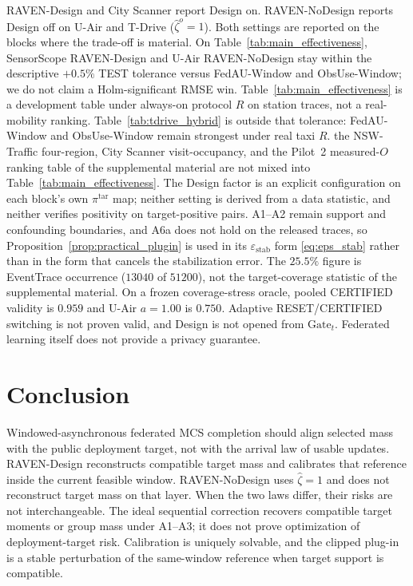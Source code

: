 \documentclass[letterpaper,journal]{IEEEtran}
\begin{document}
RAVEN-Design and City Scanner
report Design on.  RAVEN-NoDesign reports Design off on U-Air and T-Drive
($\widehat\zeta^{o}=1$).  Both settings are reported on the blocks where the
trade-off is material.
On Table~\ref{tab:main_effectiveness}, SensorScope RAVEN-Design and U-Air
RAVEN-NoDesign stay within the descriptive $+0.5\%$ TEST tolerance versus
FedAU-Window and ObsUse-Window; we do not claim a Holm-significant RMSE win.
Table~\ref{tab:main_effectiveness} is a development table under
always-on protocol $R$ on station traces, not a real-mobility ranking.
Table~\ref{tab:tdrive_hybrid} is outside that tolerance:
FedAU-Window and ObsUse-Window remain strongest under real taxi $R$.
the NSW-Traffic four-region, City Scanner visit-occupancy, and
the Pilot~2 measured-$O$ ranking table of the supplemental material are not mixed into
Table~\ref{tab:main_effectiveness}.
The Design factor is an explicit configuration on each block's own
$\pi^{\mathrm{tar}}$ map; neither setting is derived from a data statistic,
and neither verifies positivity on target-positive pairs.
A1--A2 remain support and confounding boundaries, and A6a does not hold
on the released traces, so Proposition~\ref{prop:practical_plugin} is used
in its $\varepsilon_{\mathrm{stab}}$ form \eqref{eq:eps_stab} rather than in
the form that cancels the stabilization error.
The $25.5\%$ figure is EventTrace occurrence ($13040$ of $51200$), not
the target-coverage statistic of the supplemental material.
On a frozen coverage-stress oracle, pooled CERTIFIED validity is $0.959$
and U-Air $a=1.00$ is $0.750$.  Adaptive RESET/CERTIFIED switching is not
proven valid, and Design is not opened from $\mathrm{Gate}_t$.
Federated learning itself does not provide a privacy guarantee.


\section{Conclusion}
\label{sec:conclusion}

Windowed-asynchronous federated MCS completion should align selected mass
with the public deployment target, not with the arrival law of usable
updates.  RAVEN-Design reconstructs compatible target mass and
calibrates that reference inside the current feasible window.
RAVEN-NoDesign uses $\widehat\zeta=1$ and does not reconstruct target mass on that
layer.  When the two laws differ, their risks are not
interchangeable.  The ideal sequential correction recovers compatible
target moments or group mass under A1--A3; it does not prove optimization
of deployment-target risk.  Calibration is uniquely solvable, and the
clipped plug-in is a stable perturbation of the same-window reference
when target support is compatible.
\end{document}
